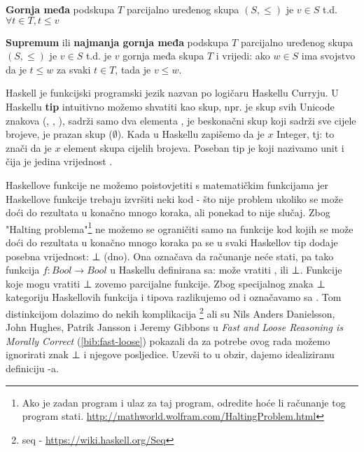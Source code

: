   \begin{definition}
    \textbf{Gornja međa} podskupa $T$ parcijalno uređenog skupa $(S, \leq)$ je $v \in S$ t.d. $\forall t \in T, t \leq v$
    \end{definition}
  \begin{definition}
    \textbf{Supremum} ili \textbf{najmanja gornja međa} podskupa $T$ parcijalno uređenog skupa $(S, \leq)$ je $v \in S$ t.d. je $v$ gornja međa skupa $T$ i vrijedi: ako $w \in S$ ima svojstvo da je $t \leq w$ za svaki $t \in T$, tada je $v \leq w$.
    \end{definition}
  
  Haskell je funkcijski programski jezik nazvan po logičaru Haskellu Curryju. U
  Haskellu \textbf{tip} intuitivno možemo shvatiti kao skup, npr.
   je skup svih Unicode znakova (,
  , ),  sadrži samo dva elementa
  ,  je beskonačni skup koji sadrži
  sve cijele brojeve,  je prazan skup ($\emptyset$).
  Kada u Haskellu zapišemo da je $x$ Integer, tj:
  to znači da je $x$ element skupa cijelih brojeva. Poseban tip je
  \codei{()} koji nazivamo unit i čija je jedina vrijednost
  \codei{()}.

  Haskellove funkcije ne možemo poistovjetiti s matematičkim funkcijama jer
  Haskellove funkcije trebaju izvršiti neki kod - što nije problem ukoliko se
  može doći do rezultata u konačno mnogo koraka, ali ponekad to nije slučaj. Zbog "Halting
  problema"\footnote{Ako je zadan program i ulaz za taj program, odredite hoće
    li računanje tog program stati.
    \url{http://mathworld.wolfram.com/HaltingProblem.html}} ne možemo se
  ograničiti samo na funkcije kod kojih se može doći do rezultata u konačno
  mnogo koraka pa se u svaki Haskellov tip dodaje posebna vrijednost: ⊥ (dno).
  Ona označava da računanje neće stati, pa tako funkcija $f:
  Bool \to Bool$  u Haskellu definirana sa:
  može vratiti ,  ili ⊥. Funkcije koje mogu vratiti ⊥
  zovemo parcijalne funkcije.
  Zbog specijalnog znaka ⊥ kategoriju Haskellovih funkcija i tipova razlikujemo
  od  i označavamo sa . Tom distinkcijom dolazimo
  do nekih komplikacija \footnote{seq - \url{https://wiki.haskell.org/Seq}}
  ali su Nils Anders Danielsson, John Hughes, Patrik Jansson i Jeremy Gibbons
  u \textit{Fast and Loose Reasoning is Morally Correct} (\ref{bib:fast-loose}) pokazali
  da za potrebe ovog rada možemo ignorirati znak ⊥ i njegove posljedice. Uzevši to u obzir, dajemo idealiziranu definiciju -a.\\
  
